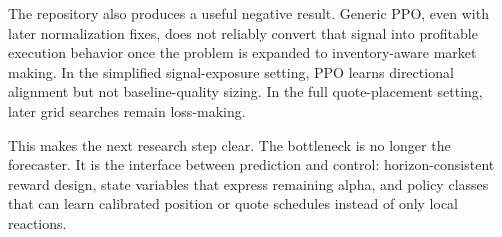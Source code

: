 \documentclass[11pt]{article}
\begin{document}
The repository also produces a useful negative result. Generic PPO, even with later normalization fixes, does not reliably convert that signal into profitable execution behavior once the problem is expanded to inventory-aware market making. In the simplified signal-exposure setting, PPO learns directional alignment but not baseline-quality sizing. In the full quote-placement setting, later grid searches remain loss-making.

This makes the next research step clear. The bottleneck is no longer the forecaster. It is the interface between prediction and control: horizon-consistent reward design, state variables that express remaining alpha, and policy classes that can learn calibrated position or quote schedules instead of only local reactions.
\end{document}
